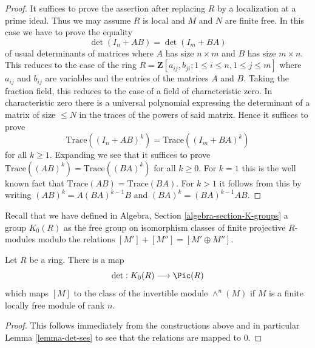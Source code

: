 \begin{proof}
It suffices to prove the assertion after replacing $R$ by a localization
at a prime ideal. Thus we may assume $R$ is local and $M$ and $N$ are
finite free. In this case we have to prove the equality
$$
\det(I_n + AB) = \det(I_m + BA)
$$
of usual determinants of matrices where $A$ has size $n \times m$
and $B$ has size $m \times n$. This reduces to the case
of the ring $R = \mathbf{Z}[a_{ij}, b_{ji}; 1 \leq i \leq n, 1 \leq j \leq m]$
where $a_{ij}$ and $b_{ij}$ are variables and the entries of the
matrices $A$ and $B$. Taking the fraction field, this reduces to the
case of a field of characteristic zero. In characteristic zero there
is a universal polynomial expressing the determinant of a matrix
of size $\leq N$ in the traces of the powers of said matrix.
Hence it suffices to prove
$$
\text{Trace}((I_n + AB)^k) = \text{Trace}((I_m + BA)^k)
$$
for all $k \geq 1$. Expanding we see that it suffices to prove
$\text{Trace}((AB)^k) = \text{Trace}((BA)^k)$ for all $k \geq 0$.
For $k = 1$ this is the well known fact that
$\text{Trace}(AB) = \text{Trace}(BA)$. For $k > 1$
it follows from this by writing $(AB)^k = A(BA)^{k - 1}B$
and $(BA)^k = (BA)^{k - 1} A B$.
\end{proof}

\noindent
Recall that we have defined in Algebra, Section \ref{algebra-section-K-groups}
a group $K_0(R)$ as the free group on isomorphism classes
of finite projective $R$-modules modulo the relations
$[M'] + [M''] = [M' \oplus M'']$.

\begin{lemma}
\label{lemma-det}
Let $R$ be a ring. There is a map
$$
\det : K_0(R) \longrightarrow \Pic(R)
$$
which maps $[M]$ to the class of the invertible module
$\wedge^n(M)$ if $M$ is a finite locally free module of rank $n$.
\end{lemma}

\begin{proof}
This follows immediately from the constructions above and in particular
Lemma \ref{lemma-det-ses} to see that the relations are mapped to $0$.
\end{proof}





